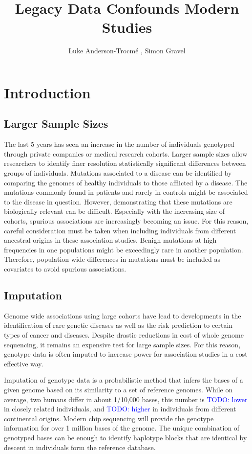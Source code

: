 \documentclass[12pt]{amsart}
\title{Legacy Data Confounds Modern Studies}
\author{Luke Anderson-Trocm\'e , Simon Gravel}
\newcommand{\todo}[1]{\textcolor{blue}{TODO: #1}}
\begin{document}
\maketitle
\tableofcontents
\clearpage
			\section{Introduction}
	\subsection{Larger Sample Sizes}			
The last 5 years has seen an increase in the number of individuals genotyped through private companies or medical research cohorts. 
Larger sample sizes allow researchers to identify finer resolution statistically significant differences between groups of individuals. 
Mutations associated to a disease can be identified by comparing the genomes of healthy individuals to those afflicted by a disease. 
The mutations commonly found in patients and rarely in controls might be associated to the disease in question.
However, demonstrating that these mutations are biologically relevant can be difficult.
Especially with the increasing size of cohorts, spurious associations are increasingly becoming an issue. 
For this reason, careful consideration must be taken when including individuals from different ancestral origins in these association studies.
Benign mutations at high frequencies in one populations might be exceedingly rare in another population.
Therefore, population wide differences in mutations must be included as covariates to avoid spurious associations.

	\subsection{Imputation}
Genome wide associations using large cohorts have lead to developments in the identification of rare genetic diseases as well as the risk prediction to certain types of cancer and diseases. 
Despite drastic reductions in cost of whole genome sequencing, it remains an expensive test for large sample sizes.
For this reason, genotype data is often imputed to increase power for association studies in a cost effective way.


Imputation of genotype data is a probabilistic method that infers the bases of a given genome based on its similarity to a set of reference genomes.
While on average, two humans differ in about 1/10,000 bases, this number is \todo{lower} in closely related individuals, and \todo{higher} in individuals from different continental origins.
Modern chip sequencing will provide the genotype information for over 1 million bases of the genome.
The unique combination of genotyped bases can be enough to identify haplotype blocks that are identical by descent in individuals form the reference database.
\end{document}
